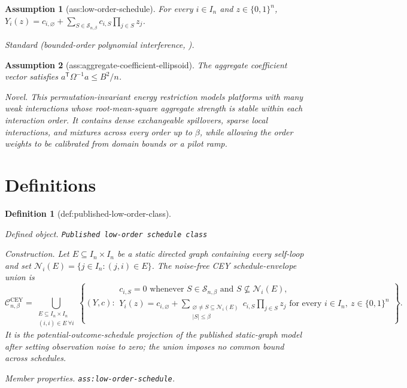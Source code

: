 \documentclass{article}
\newtheorem{assumption}{Assumption}
\newtheorem{definition}{Definition}
\begin{document}
\begin{assumption}[ass:low-order-schedule]\label{ass:low-order-schedule}
For every \(i\in I_n\) and \(z\in\{0,1\}^n\), \(Y_i(z)=c_{i,\varnothing}+\sum_{S\in\mathcal S_{n,\beta}}c_{i,S}\prod_{j\in S}z_j\).
\par\smallskip\noindent\emph{Standard} (bounded-order polynomial interference, \cite{CortezEichhornYu2022}).
\end{assumption}

\begin{assumption}[ass:aggregate-coefficient-ellipsoid]\label{ass:aggregate-coefficient-ellipsoid}
The aggregate coefficient vector satisfies \(a^{\mathsf T}\Omega^{-1}a\le B^2/n\).
\par\smallskip\noindent\emph{Novel.} This permutation-invariant energy restriction models platforms with many weak interactions whose root-mean-square aggregate strength is stable within each interaction order. It contains dense exchangeable spillovers, sparse local interactions, and mixtures across every order up to \(\beta\), while allowing the order weights to be calibrated from domain bounds or a pilot ramp.
\end{assumption}

\section{Definitions}

\begin{definition}[def:published-low-order-class]\label{def:published-low-order-class}
\par\smallskip\noindent\emph{Defined object.} \texttt{Published low-\allowbreak{}order schedule class}
\par\smallskip\noindent\emph{Construction.} Let \(E\subseteq I_n\times I_n\) be a static directed graph containing every self-loop and set \(\mathcal N_i(E)=\{j\in I_n:(j,i)\in E\}\).  The noise-free CEY schedule-envelope union is
\[
\mathcal C^{\mathrm{CEY}}_{n,\beta}
=\bigcup_{\substack{E\subseteq I_n\times I_n\\(i,i)\in E\ \forall i}}
\left\{(Y,c):
\begin{array}{l}
c_{i,S}=0\text{ whenever }S\in\mathcal S_{n,\beta}\text{ and }S\nsubseteq\mathcal N_i(E),\\
Y_i(z)=c_{i,\varnothing}+\displaystyle\sum_{\substack{\varnothing\ne S\subseteq\mathcal N_i(E)\\|S|\le\beta}}c_{i,S}\prod_{j\in S}z_j
\text{ for every }i\in I_n,\ z\in\{0,1\}^n
\end{array}\right\}.
\]
It is the potential-outcome-schedule projection of the published static-graph model after setting observation noise to zero; the union imposes no common bound across schedules.
\par\smallskip\noindent\emph{Member properties.} \texttt{ass:\allowbreak{}low-\allowbreak{}order-\allowbreak{}schedule}.
\end{definition}
\end{document}
